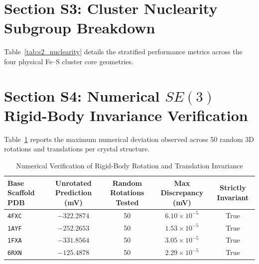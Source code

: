 \documentclass[journal=jcisd8,manuscript=suppinfo]{achemso}
\begin{document}
\section{Section S3: Cluster Nuclearity Subgroup Breakdown}

Table~\ref{tab:s2_nuclearity} details the stratified performance metrics across the four physical Fe--S cluster core geometries.

\begin{table}[htbp]
\centering
\caption{Domain Shift and Out-of-Fold Performance Stratified by Fe--S Cluster Nuclearity}
\label{tab:s2_nuclearity}
\end{table}

\section{Section S4: Numerical $SE(3)$ Rigid-Body Invariance Verification}

Table~\ref{tab:s4_invariance} reports the maximum numerical deviation observed across 50 random 3D rotations and translations per crystal structure.

\begin{table}[htbp]
\centering
\caption{Numerical Verification of Rigid-Body Rotation and Translation Invariance}
\label{tab:s4_invariance}
\small
\begin{tabular*}{\textwidth}{@{\extracolsep{\fill}}lcccc@{}}
\toprule
Base Scaffold PDB & Unrotated Prediction (mV) & Random Rotations Tested & Max Discrepancy (mV) & Strictly Invariant \\
\midrule
\texttt{4FXC} & $-322.2874$ & 50 & $6.10 \times 10^{-5}$ & True \\
\texttt{1AYF} & $-252.2653$ & 50 & $1.53 \times 10^{-5}$ & True \\
\texttt{1FXA} & $-331.8564$ & 50 & $3.05 \times 10^{-5}$ & True \\
\texttt{6RXN} & $-125.4878$ & 50 & $2.29 \times 10^{-5}$ & True \\
\bottomrule
\end{tabular*}
\end{table}
\end{document}

